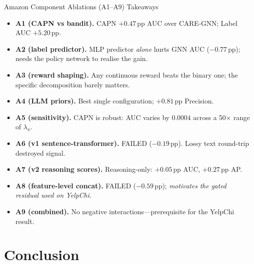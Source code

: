 \documentclass[aspectratio=169,10pt]{beamer}
\begin{document}
\begin{frame}{Amazon Component Ablations (A1--A9) Takeaways}
    \begin{itemize}\footnotesize
        \item \textbf{A1 (CAPN vs bandit).} CAPN \textcolor{positive}{$+0.47$\,pp} AUC
              over CARE-GNN; Label AUC \textcolor{positive}{$+5.20$\,pp}.
        \item \textbf{A2 (label predictor).} MLP predictor \emph{alone} hurts GNN AUC
              ($-0.77$\,pp); needs the policy network to realise the gain.
        \item \textbf{A3 (reward shaping).} Any continuous reward beats the binary one;
              the specific decomposition barely matters.
        \item \textbf{A4 (LLM priors).} Best single configuration; $+0.81$\,pp Precision.
        \item \textbf{A5 (sensitivity).} CAPN is robust: AUC varies by $0.0004$ across
              a 50$\times$ range of $\lambda_\pi$.
        \item \textbf{A6 (v1 sentence-transformer).} \textcolor{negative}{FAILED} ($-0.19$\,pp).
              Lossy text round-trip destroyed signal.
        \item \textbf{A7 (v2 reasoning scores).} Reasoning-only: \textcolor{positive}{$+0.05$\,pp AUC,
              $+0.27$\,pp AP}.
        \item \textbf{A8 (feature-level concat).} \textcolor{negative}{FAILED} ($-0.59$\,pp);
              \emph{motivates the gated residual used on YelpChi}.
        \item \textbf{A9 (combined).} No negative interactions---prerequisite for the YelpChi result.
    \end{itemize}
\end{frame}

\section{Conclusion}
\end{document}
